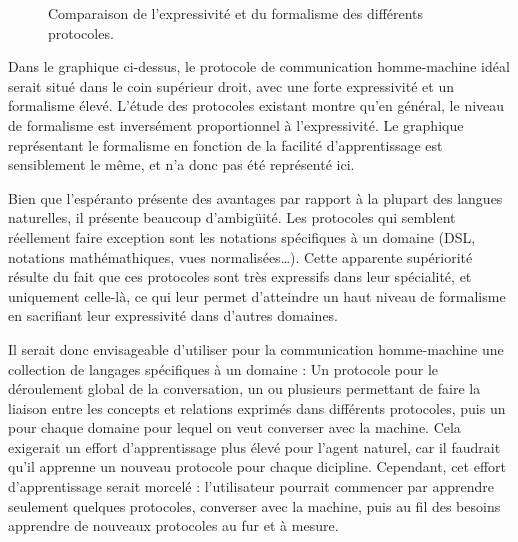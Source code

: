 \documentclass[french,a4paper]{article}
\begin{document}
\begin{figure}[h]
  \caption{Comparaison de l'expressivité et du formalisme des différents protocoles.}
\end{figure}

Dans le graphique ci-dessus, le protocole de communication
homme-machine idéal serait situé dans le coin supérieur droit, avec
une forte expressivité et un formalisme élevé. L'étude des protocoles
existant montre qu'en général, le niveau de formalisme est inversément
proportionnel à l'expressivité. Le graphique représentant le
formalisme en fonction de la facilité d'apprentissage est sensiblement
le même, et n'a donc pas été représenté ici.

Bien que l'espéranto présente des avantages par rapport à la plupart
des langues naturelles, il présente beaucoup d'ambigüité. Les
protocoles qui semblent réellement faire exception sont les notations
spécifiques à un domaine (DSL, notations mathémathiques, vues
normalisées…). Cette apparente supériorité résulte du fait que ces
protocoles sont très expressifs dans leur spécialité, et uniquement
celle-là, ce qui leur permet d'atteindre un haut niveau de formalisme
en sacrifiant leur expressivité dans d'autres domaines.

Il serait donc envisageable d'utiliser pour la communication
homme-machine une collection de langages spécifiques à un domaine : Un
protocole pour le déroulement global de la conversation, un ou
plusieurs permettant de faire la liaison entre les concepts et
relations exprimés dans différents protocoles, puis un pour chaque
domaine pour lequel on veut converser avec la machine. Cela exigerait
un effort d'apprentissage plus élevé pour l'agent naturel, car il
faudrait qu'il apprenne un nouveau protocole pour chaque
dicipline. Cependant, cet effort d'apprentissage serait morcelé :
l'utilisateur pourrait commencer par apprendre seulement quelques
protocoles, converser avec la machine, puis au fil des besoins
apprendre de nouveaux protocoles au fur et à mesure.
\end{document}
